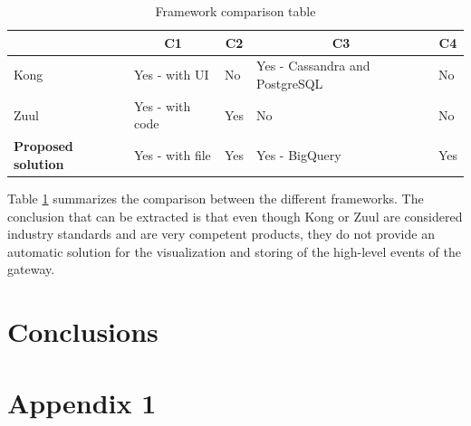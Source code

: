 \documentclass[english, 12pt, a4paper, sci, utf8, a-1b, online]{aaltothesis}
\begin{document}
\begin{table}[h]
\begin{tabular}{|l|l|l|l|l|}
\hline
                  & \multicolumn{1}{c|}{C1} & \multicolumn{1}{c|}{C2} & \multicolumn{1}{c|}{C3}        & \multicolumn{1}{c|}{C4} \\ \hline
\hline
Kong              & Yes - with UI           & No                      & Yes - Cassandra and PostgreSQL & No                      \\ \hline
Zuul              & Yes - with code         & Yes                     & No                             & No                      \\ \hline
\textbf{Proposed solution} & Yes - with file         & Yes                     & Yes - BigQuery                 & Yes                     \\ \hline
\end{tabular}
\caption{Framework comparison table}
\label{tab:frameworks}
\end{table}

Table \ref{tab:frameworks} summarizes the comparison between the different frameworks. The conclusion that can be extracted is that even though Kong or Zuul are considered industry standards and are very competent products, they do not provide an automatic solution for the visualization and storing of the high-level events of the gateway.

\clearpage
\section{Conclusions}
\label{sec:consclussion}




\clearpage
\thesisbibliography




\clearpage
\thesisappendix

\section{Appendix 1}
\label{apx:gateway-gathering}
\end{document}
